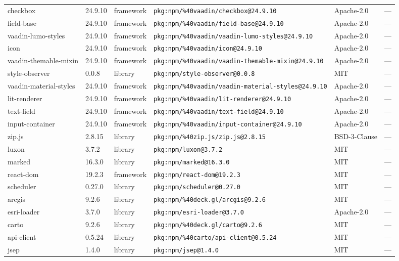 \documentclass[11pt]{article}
\begin{document}
\begin{longtable}{|l|l|l|p{2.2cm}|l|p{4cm}|}
checkbox & 24.9.10 & framework & \texttt{pkg:npm/\%40vaadin/checkbox@24.9.10} & Apache-2.0 & — \\
field-base & 24.9.10 & framework & \texttt{pkg:npm/\%40vaadin/field-base@24.9.10} & Apache-2.0 & — \\
vaadin-lumo-styles & 24.9.10 & framework & \texttt{pkg:npm/\%40vaadin/vaadin-lumo-styles@24.9.10} & Apache-2.0 & — \\
icon & 24.9.10 & framework & \texttt{pkg:npm/\%40vaadin/icon@24.9.10} & Apache-2.0 & — \\
vaadin-themable-mixin & 24.9.10 & framework & \texttt{pkg:npm/\%40vaadin/vaadin-themable-mixin@24.9.10} & Apache-2.0 & — \\
style-observer & 0.0.8 & library & \texttt{pkg:npm/style-observer@0.0.8} & MIT & — \\
vaadin-material-styles & 24.9.10 & framework & \texttt{pkg:npm/\%40vaadin/vaadin-material-styles@24.9.10} & Apache-2.0 & — \\
lit-renderer & 24.9.10 & framework & \texttt{pkg:npm/\%40vaadin/lit-renderer@24.9.10} & Apache-2.0 & — \\
text-field & 24.9.10 & framework & \texttt{pkg:npm/\%40vaadin/text-field@24.9.10} & Apache-2.0 & — \\
input-container & 24.9.10 & framework & \texttt{pkg:npm/\%40vaadin/input-container@24.9.10} & Apache-2.0 & — \\
zip.js & 2.8.15 & library & \texttt{pkg:npm/\%40zip.js/zip.js@2.8.15} & BSD-3-Clause & — \\
luxon & 3.7.2 & library & \texttt{pkg:npm/luxon@3.7.2} & MIT & — \\
marked & 16.3.0 & library & \texttt{pkg:npm/marked@16.3.0} & MIT & — \\
react-dom & 19.2.3 & framework & \texttt{pkg:npm/react-dom@19.2.3} & MIT & — \\
scheduler & 0.27.0 & library & \texttt{pkg:npm/scheduler@0.27.0} & MIT & — \\
arcgis & 9.2.6 & library & \texttt{pkg:npm/\%40deck.gl/arcgis@9.2.6} & MIT & — \\
esri-loader & 3.7.0 & library & \texttt{pkg:npm/esri-loader@3.7.0} & Apache-2.0 & — \\
carto & 9.2.6 & library & \texttt{pkg:npm/\%40deck.gl/carto@9.2.6} & MIT & — \\
api-client & 0.5.24 & library & \texttt{pkg:npm/\%40carto/api-client@0.5.24} & MIT & — \\
jsep & 1.4.0 & library & \texttt{pkg:npm/jsep@1.4.0} & MIT & — \\

\end{longtable}
\end{document}
